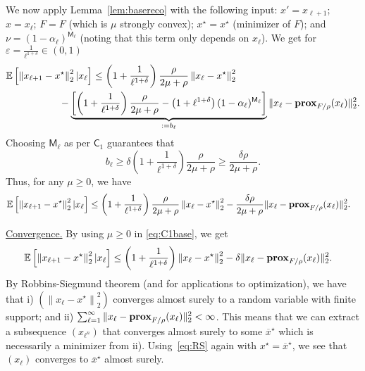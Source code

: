     We now apply Lemma~\ref{lem:basereco} with the following input: $x' = x_{\ell+1}$; $x = x_\ell$; $F = F$ (which is $\mu$ strongly convex); $x^\star =x^\star$ (minimizer of $F$); and $\nu = \left( 1-\alpha_\ell  \right)^{\mathsf{M}_\ell}$ (noting that this term only depends on $x_\ell$). We get for $\varepsilon = \frac{1}{\ell^{1+\delta}} \in (0,1)$
        \begin{align*}
        \EE \left[   \left\|x_{\ell+1} - x^\star  \right\|^2_2 | x_\ell \right] &\leq \left( 1 + \frac{1}{\ell^{1+\delta}} \right)  \frac{{\rho }}{2\mu + {\rho }}  \left\| x_\ell - x^\star \right\|^2_2\\
   \nonumber     &\hspace*{-1.2cm} - \underbrace{\left[ \left(1 + \frac{1}{\ell^{1+\delta}}\right) \frac{{\rho }}{2\mu + {\rho }}  - \left( 1 + \ell^{1+\delta} \right)  (1-\alpha_\ell)^{\mathsf{M}_\ell}  \right]}_{:= b_\ell}  \|x_\ell -  \prox_{F/{\rho }}(x_\ell)   \|^2_2.
     \end{align*}
     Choosing $\mathsf{M}_\ell$
     as per $\mathsf{C}_1$ guarantees that
     $$
     b_\ell \geq \delta \left( 1 + \frac{1}{\ell^{1+\delta}} \right)  \frac{{\rho }}{2\mu + {\rho }} \geq    \frac{{\delta  \rho }}{2\mu + {\rho }} .
     $$ 
     Thus, for any $\mu\geq 0$, %
     we have
     \begin{align}\label{eq:C1base}
        \mathbb{E} \left[   \left\|x_{\ell+1} - x^\star  \right\|^2_2 | x_\ell \right] &\leq \left( 1 + \frac{1}{\ell^{1+\delta}} \right) \frac{{ \rho }}{2\mu + {\rho }}  \left\| x_\ell - x^\star \right\|^2_2 -  \frac{{\delta  \rho }}{2\mu + {\rho }} \|x_\ell -  \mathbf{prox}_{F/{\rho }}(x_\ell)   \|^2_2.
     \end{align}
     
     \vspace*{1ex}
     \noindent\underline{Convergence.} By using $\mu\geq 0$ in \;\eqref{eq:C1base}, we get 
          \begin{align}
          \label{eq:RS}
        \mathbb{E} \left[   \left\|x_{\ell+1} - x^\star  \right\|^2_2 | x_\ell \right] &\leq \left( 1 + \frac{1}{\ell^{1+\delta}} \right)  \left\| x_\ell - x^\star \right\|^2_2 -  \delta \|x_\ell -  \mathbf{prox}_{F/{\rho }}(x_\ell)   \|_2^2 .
     \end{align}
     By Robbins-Siegmund theorem \cite[Th.~1]{robbins1971convergence} (and \cite{iutzeler2013asynchronous,bianchi2015coordinate,combettes2015stochastic} for applications to optimization), we have that i) $(\left\|x_{\ell} - x^\star  \right\|^2_2)$ converges almost surely to a random variable with finite support; and ii) $ \sum_{\ell=1}^\infty \|x_\ell -  \mathbf{prox}_{F/{\rho }}(x_\ell)   \|^2_2 < \infty$. This means that we can extract a subsequence $(x_{\ell^n})$ that converges almost surely to some $\overline{x}^\star$ which is necessarily a minimizer from ii). Using~\eqref{eq:RS} again with $x^\star = \overline{x}^\star$, we see that $(x_{\ell})$ converges to $\overline{x}^\star$ almost surely.
     

